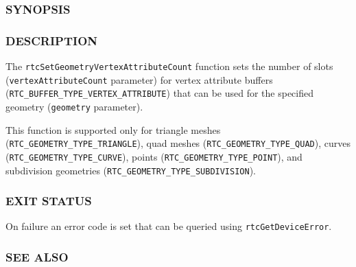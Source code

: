 \begin{Shaded}
\begin{Highlighting}[]
\OperatorTok{{-}}
\end{Highlighting}
\end{Shaded}

\subsubsection{SYNOPSIS}\label{synopsis}

\begin{Shaded}
\begin{Highlighting}[]

\OperatorTok{(}
\OperatorTok{,}
   
\OperatorTok{);}
\end{Highlighting}
\end{Shaded}

\subsubsection{DESCRIPTION}\label{description}

The \texttt{rtcSetGeometryVertexAttributeCount} function sets the number
of slots (\texttt{vertexAttributeCount} parameter) for vertex attribute
buffers (\texttt{RTC\_BUFFER\_TYPE\_VERTEX\_ATTRIBUTE}) that can be used
for the specified geometry (\texttt{geometry} parameter).

This function is supported only for triangle meshes
(\texttt{RTC\_GEOMETRY\_TYPE\_TRIANGLE}), quad meshes
(\texttt{RTC\_GEOMETRY\_TYPE\_QUAD}), curves
(\texttt{RTC\_GEOMETRY\_TYPE\_CURVE}), points
(\texttt{RTC\_GEOMETRY\_TYPE\_POINT}), and subdivision geometries
(\texttt{RTC\_GEOMETRY\_TYPE\_SUBDIVISION}).

\subsubsection{EXIT STATUS}\label{exit-status}

On failure an error code is set that can be queried using
\texttt{rtcGetDeviceError}.

\subsubsection{SEE ALSO}\label{see-also}

